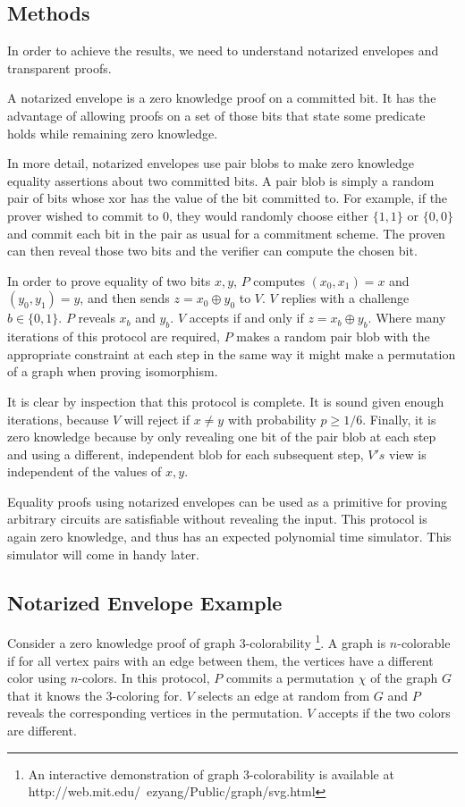 \documentclass{article}
\begin{document}
\subsection{Methods}
In order to achieve the results, we need to understand notarized
envelopes and transparent proofs.

A notarized envelope is a zero knowledge proof on a committed bit. It
has the advantage of allowing proofs on a set of those bits that state
some predicate holds while remaining zero knowledge.

In more detail, notarized envelopes use pair blobs to make zero
knowledge equality assertions about two committed bits. A pair blob is
simply a random pair of bits whose xor has the value of the bit
committed to. For example, if the prover wished to commit to 0, they
would randomly choose either $\{1, 1\}$ or $\{0, 0\}$ and commit each bit
in the pair as usual for a commitment scheme. The proven can then reveal
those two bits and the verifier can compute the chosen bit.

In order to prove equality of two bits $x, y$, $P$ computes
$(x_0,x_1) = x$ and $(y_0, y_1) = y$, and then sends $z = x_0 \oplus y_0$
to $V$. $V$ replies with a challenge $b \in \{0,1\}$. $P$ reveals $x_b$
and $y_b$. $V$ accepts if and only if $z = x_b \oplus y_b$.
Where many iterations of this protocol are required, $P$
makes a random pair blob with the appropriate constraint at each step
in the same way it might make a permutation of a graph when proving
isomorphism.

It is clear by inspection that this protocol is complete. It is sound
given enough iterations, because $V$
will reject if $x \neq y$
with probability $p \ge 1/6$.
Finally, it is zero knowledge because by only revealing one bit of the
pair blob at each step and using a different, independent blob for
each subsequent step, $V's$
view is independent of the values of $x, y$.

Equality proofs using notarized envelopes can be used as a primitive
for proving arbitrary circuits are satisfiable without revealing the
input. This protocol is again zero knowledge, and thus has an expected
polynomial time simulator. This simulator will come in handy later.

\subsection{Notarized Envelope Example}

Consider a zero knowledge proof of graph 3-colorability \footnote{An
  interactive demonstration of graph 3-colorability is available at
  http://web.mit.edu/~ezyang/Public/graph/svg.html}. A graph is
$n$-colorable
if for all vertex pairs with an edge between them, the vertices have a
different color using $n$-colors.
In this protocol, $P$
commits a permutation $\chi$
of the graph $G$
that it knows the 3-coloring for. $V$
selects an edge at random from $G$
and $P$
reveals the corresponding vertices in the permutation. $V$
accepts if the two colors are different.
\end{document}
